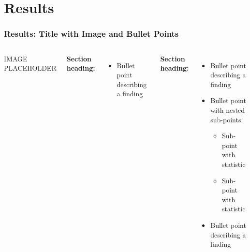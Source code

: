 \documentclass[aspectratio=169]{beamer}
\begin{document}

\section{Results}

\begin{frame}
  \frametitle{Results: Title with Image and Bullet Points}
  \begin{columns}[T,onlytextwidth]
    \hspace{0.3cm}IMAGE PLACEHOLDER %

    \fontsize{10}{14}\selectfont
    \begin{minipage}[t]{\linewidth}
      \textbf{\textcolor{RWTHblue}{Section heading:}}
      \begin{itemize}\setlength{\itemsep}{0.12em}
        \item Bullet point describing a finding
      \end{itemize}
      \textbf{\textcolor{RWTHblue}{Section heading:}}
      \begin{itemize}\setlength{\itemsep}{0.1em}
        \item Bullet point describing a finding
        \item Bullet point with nested sub-points:
        \begin{itemize}
          \item Sub-point with statistic
          \item Sub-point with statistic
        \end{itemize}
        \item Bullet point describing a finding
      \end{itemize}
    \end{minipage}
  \end{columns}
\end{frame}
\end{document}
